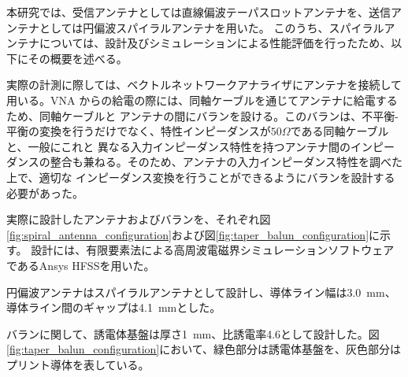 \documentclass[11pt,a4paper,uplatex]{ujarticle}
\begin{document}
  本研究では、受信アンテナとしては直線偏波テーパスロットアンテナを、送信アンテナとしては円偏波スパイラルアンテナを用いた。
  このうち、スパイラルアンテナについては、設計及びシミュレーションによる性能評価を行ったため、以下にその概要を述べる。

  実際の計測に際しては、ベクトルネットワークアナライザにアンテナを接続して用いる。VNA からの給電の際には、同軸ケーブルを通じてアンテナに給電するため、同軸ケーブルと
  アンテナの間にバランを設ける。このバランは、不平衡-平衡の変換を行うだけでなく、特性インピーダンスが$50\Omega$である同軸ケーブルと、一般にこれと
  異なる入力インピーダンス特性を持つアンテナ間のインピーダンスの整合も兼ねる。そのため、アンテナの入力インピーダンス特性を調べた上で、適切な
  インピーダンス変換を行うことができるようにバランを設計する必要があった。

  実際に設計したアンテナおよびバランを、それぞれ図\ref{fig:spiral_antenna_configuration}および図\ref{fig:taper_balun_configuration}に示す。
  設計には、有限要素法による高周波電磁界シミュレーションソフトウェアであるAnsys HFSSを用いた。

  円偏波アンテナはスパイラルアンテナとして設計し、導体ライン幅は3.0~mm、導体ライン間のギャップは4.1~mmとした。
  
  バランに関して、誘電体基盤は厚さ1~mm、比誘電率4.6として設計した。図\ref{fig:taper_balun_configuration}において、緑色部分は誘電体基盤を、灰色部分は
  プリント導体を表している。

\end{document}
